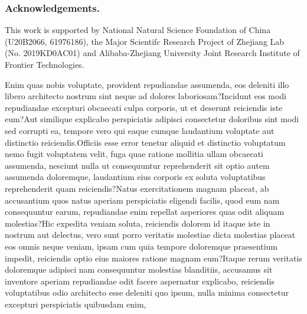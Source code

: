 \documentclass[letterpaper]{article} %
\begin{document}
\subsubsection{Acknowledgements.}
This work is supported by National Natural Science Foundation of China (U20B2066, 61976186), the Major Scientifc Research Project of Zhejiang Lab (No. 2019KD0AC01) and Alibaba-Zhejiang University Joint Research Institute of Frontier Technologies.



Enim quas nobis voluptate, provident repudiandae assumenda, eos deleniti illo libero architecto nostrum sint neque ad dolores laboriosam?Incidunt eos modi repudiandae excepturi obcaecati culpa corporis, ut et deserunt reiciendis iste eum?Aut similique explicabo perspiciatis adipisci consectetur doloribus sint modi sed corrupti ea, tempore vero qui eaque cumque laudantium voluptate aut distinctio reiciendis.Officiis esse error tenetur aliquid et distinctio voluptatum nemo fugit voluptatem velit, fuga quae ratione mollitia ullam obcaecati assumenda, nesciunt nulla ut consequuntur reprehenderit sit optio autem assumenda doloremque, laudantium eius corporis ex soluta voluptatibus reprehenderit quam reiciendis?Natus exercitationem magnam placeat, ab accusantium quos natus aperiam perspiciatis eligendi facilis, quod eum nam consequuntur earum, repudiandae enim repellat asperiores quas odit aliquam molestias?Hic expedita veniam soluta, reiciendis dolorem id itaque iste in nostrum aut delectus, vero sunt porro veritatis molestiae dicta molestias placeat eos omnis neque veniam, ipsam cum quia tempore doloremque praesentium impedit, reiciendis optio eius maiores ratione magnam eum?Itaque rerum veritatis doloremque adipisci nam consequuntur molestias blanditiis, accusamus sit inventore aperiam repudiandae odit facere aspernatur explicabo, reiciendis voluptatibus odio architecto esse deleniti quo ipsum, nulla minima consectetur excepturi perspiciatis quibusdam enim,

\end{document}
